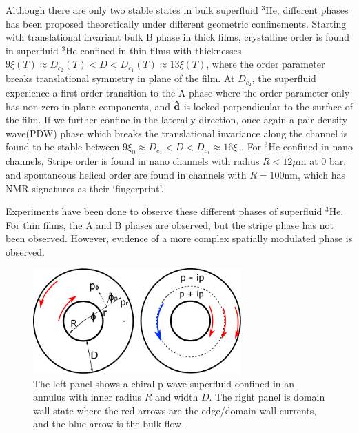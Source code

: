 \documentclass[aps,prb,reprint,groupedaddress]{revtex4-2}
\begin{document}
Although there are only two stable states in bulk superfluid $^3$He, different
phases has been proposed theoretically under different geometric confinements.
Starting with translational invariant bulk B phase in thick films, crystalline
order is found in superfluid $^3$He confined in thin films with thicknesses
$9\xi(T)\approx D_{c_2}(T)<D<D_{c_1}(T)\approx13\xi(T)$\cite{vorontsov07},
where the order parameter breaks translational symmetry in plane of the film.
At $D_{c_2}$, the superfluid experience a first-order transition to the A phase
where the order parameter only has non-zero in-plane components, and $\vu{d}$
is locked perpendicular to the surface of the film. If we further confine in
the laterally direction, once again a pair density wave(PDW) phase which breaks
the translational invariance along the channel is found to be stable between
$9\xi_0\approx D_{c_2}<D<D_{c_1}\approx16\xi_0$\cite{Wu18}. For $^3$He confined
in nano channels, Stripe order is found in nano channels with radius $R<12\mu$m
at 0 bar\cite{Aoyama14}, and spontaneous helical order are found in channels with
$R=100$nm\cite{Wiman15,Wiman18}, which has NMR signatures as their `fingerprint'.

Experiments have been done to observe these different phases of superfluid $^3$He.
For thin films, the A and B phases are observed\cite{levitin10,Levitin13,zhelev17},
but the stripe phase has not been observed. However, evidence of a more complex
spatially modulated	phase is observed\cite{levitin19,shook20}.

\begin{figure}\label{AnnulusFig}
    \centering
    \includegraphics[width=8cm]{CylindricalBasis.pdf}
    \caption{The left panel shows a chiral p-wave superfluid confined in an
        annulus with inner radius $R$ and width $D$. The right panel is domain
        wall state where the red arrows are the edge/domain wall currents, and
        the blue arrow is the bulk flow.}
\end{figure}
\end{document}
